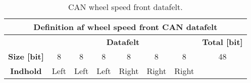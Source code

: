 \begin{table}[H] \centering
	\begin{tabular}{|c||c|c|c|c|c|c|c|}
        \hline \multicolumn{8}{|c|}{\textbf{Definition af wheel speed front CAN datafelt}} \\
	    \hline \hline & \multicolumn{6}{|c|}{\textbf{Datafelt}} & \textbf{Total [bit]}\\ 
        \hline \textbf{Size [bit]} & 8 & 8 & 8 & 8 & 8 & 8 & 48 \\
        \hline \textbf{Indhold} & Left & Left & Left & Right & Right & Right & \\
        \hline
    \end{tabular}
\caption{CAN wheel speed front datafelt.}
\label{table:CAN_WhlSpdF_pakke}
\end{table}






